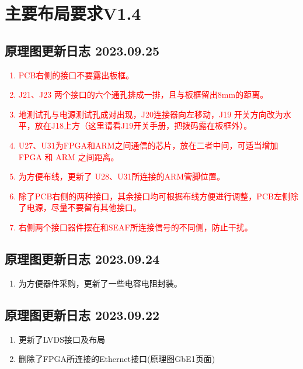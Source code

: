 
\chapter*{主要布局要求V1.4}
\section*{原理图更新日志 2023.09.25}
\textcolor{red}{
  \begin{enumerate}
    \item PCB右侧的接口不要露出板框。
    \item J21、J23 两个接口的六个通孔排成一排，且与板框留出8mm的距离。
    \item 地测试孔与电源测试孔成对出现，J20连接器向左移动，J19 开关方向改为水平，放在J18上方（这里请看J19开关手册，把拨码露在板框外）。
    \item U27、U31为FPGA和ARM之间通信的芯片，放在二者中间，可适当增加FPGA 和 ARM 之间距离。
    \item 为方便布线，更新了 U28、U31所连接的ARM管脚位置。
    \item 除了PCB右侧的两种接口，其余接口均可根据布线方便进行调整，PCB左侧除了电源，尽量不要留有其他接口。
    \item 右侧两个接口器件摆在和SEAF所连接信号的不同侧，防止干扰。
  \end{enumerate}
}
\section*{原理图更新日志 2023.09.24}
\begin{enumerate}
  \item 为方便器件采购，更新了一些电容电阻封装。
\end{enumerate}
\section*{原理图更新日志 2023.09.22}
\begin{enumerate}
  \item 更新了LVDS接口及布局
  \item 删除了FPGA所连接的Ethernet接口(原理图GbE1页面)
\end{enumerate}


